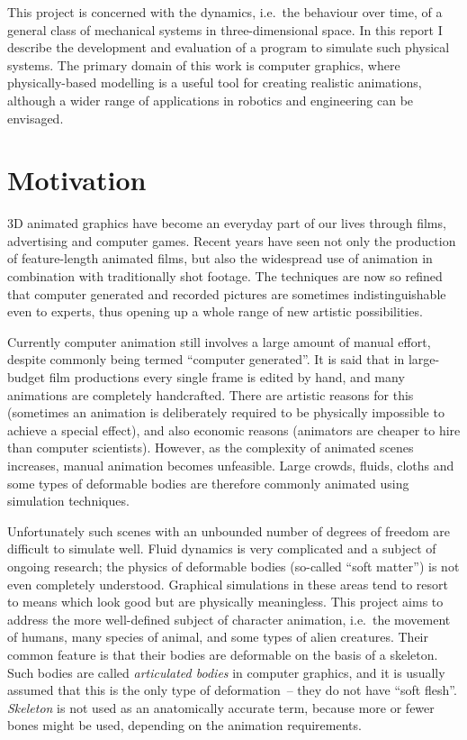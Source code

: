 This project is concerned with the dynamics, i.e.\ the behaviour over time, of a general class
of mechanical systems in three-dimensional space. In this report I describe the development and
evaluation of a program to simulate such physical systems. The primary domain of this work is
computer graphics, where physically-based modelling is a useful tool for creating realistic
animations, although a wider range of applications in robotics and engineering can be envisaged.

\section{Motivation}

3D animated graphics have become an everyday part of our lives through films, advertising and
computer games. Recent years have seen not only the production of feature-length animated films,
but also the widespread use of animation in combination with traditionally shot footage. The
techniques are now so refined that computer generated and recorded pictures are sometimes
indistinguishable even to experts, thus opening up a whole range of new artistic possibilities.

Currently computer animation still involves a large amount of manual effort, despite commonly
being termed ``computer generated''. It is said that in large-budget film productions every single
frame is edited by hand, and many animations are completely handcrafted. There are artistic
reasons for this (sometimes an animation is deliberately required to be physically impossible
to achieve a special effect), and also economic reasons (animators are cheaper to hire than
computer scientists). However, as the complexity of animated scenes increases, manual animation
becomes unfeasible. Large crowds, fluids, cloths and some types of deformable bodies are therefore
commonly animated using simulation techniques.

Unfortunately such scenes with an unbounded number of degrees of freedom are difficult to simulate
well. Fluid dynamics is very complicated and a subject of ongoing research; the physics of
deformable bodies (so-called ``soft matter'') is not even completely understood. Graphical
simulations in these areas tend to resort to means which look good but are physically meaningless.
This project aims to address the more well-defined subject of character animation, i.e.\ the
movement of humans, many species of animal, and some types of alien creatures. Their common
feature is that their bodies are deformable on the basis of a skeleton. Such bodies are called
\emph{articulated bodies} in computer graphics, and it is usually assumed that this is the only
type of deformation~-- they do not have ``soft flesh''. \textsl{Skeleton} is not used as an
anatomically accurate term, because more or fewer bones might be used, depending on the animation
requirements.

